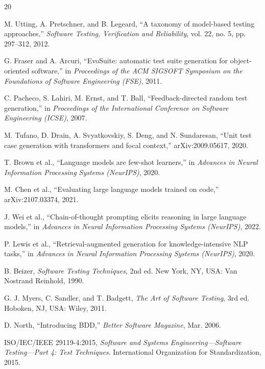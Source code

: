 \documentclass[11pt,letterpaper]{article}
\begin{document}
\begin{thebibliography}{20}

M. Utting, A. Pretschner, and B. Legeard, ``A taxonomy of model-based testing approaches,'' \textit{Software Testing, Verification and Reliability}, vol. 22, no. 5, pp. 297--312, 2012.

G. Fraser and A. Arcuri, ``EvoSuite: automatic test suite generation for object-oriented software,'' in \textit{Proceedings of the ACM SIGSOFT Symposium on the Foundations of Software Engineering (FSE)}, 2011.

C. Pacheco, S. Lahiri, M. Ernst, and T. Ball, ``Feedback-directed random test generation,'' in \textit{Proceedings of the International Conference on Software Engineering (ICSE)}, 2007.

M. Tufano, D. Drain, A. Svyatkovskiy, S. Deng, and N. Sundaresan, ``Unit test case generation with transformers and focal context,'' arXiv:2009.05617, 2020.

T. Brown et al., ``Language models are few-shot learners,'' in \textit{Advances in Neural Information Processing Systems (NeurIPS)}, 2020.

M. Chen et al., ``Evaluating large language models trained on code,'' arXiv:2107.03374, 2021.

J. Wei et al., ``Chain-of-thought prompting elicits reasoning in large language models,'' in \textit{Advances in Neural Information Processing Systems (NeurIPS)}, 2022.

P. Lewis et al., ``Retrieval-augmented generation for knowledge-intensive NLP tasks,'' in \textit{Advances in Neural Information Processing Systems (NeurIPS)}, 2020.

B. Beizer, \textit{Software Testing Techniques}, 2nd ed. New York, NY, USA: Van Nostrand Reinhold, 1990.

G. J. Myers, C. Sandler, and T. Badgett, \textit{The Art of Software Testing}, 3rd ed. Hoboken, NJ, USA: Wiley, 2011.

D. North, ``Introducing BDD,'' \textit{Better Software Magazine}, Mar. 2006.

ISO/IEC/IEEE 29119-4:2015, \textit{Software and Systems Engineering---Software Testing---Part 4: Test Techniques}. International Organization for Standardization, 2015.


\end{thebibliography}
\end{document}
